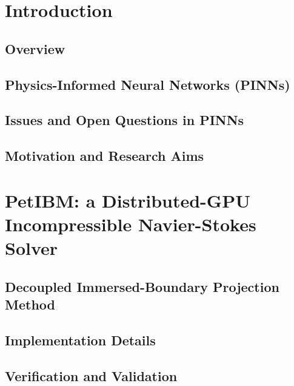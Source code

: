 \documentclass[font=STIX2]{gw-dissertation}[2021/11/19]
\begin{document}
\chapter{Introduction}

    \section{Overview}\label{sec:overview}
    

    \section{Physics-Informed Neural Networks (PINNs)}\label{sec:pinn-review}
    

    \section{Issues and Open Questions in PINNs}\label{sec:pinn-issues}
    

    \section{Motivation and Research Aims}\label{sec:aims}
    

\chapter{PetIBM: a Distributed-GPU Incompressible Navier-Stokes Solver}\label{chap:petibm}


    \section{Decoupled Immersed-Boundary Projection Method}\label{sec:petibm-math}
    

    \section{Implementation Details}\label{sec:petibm-impl}
    

    \section{Verification and Validation}\label{sec:petibm-vv}
    
\end{document}
